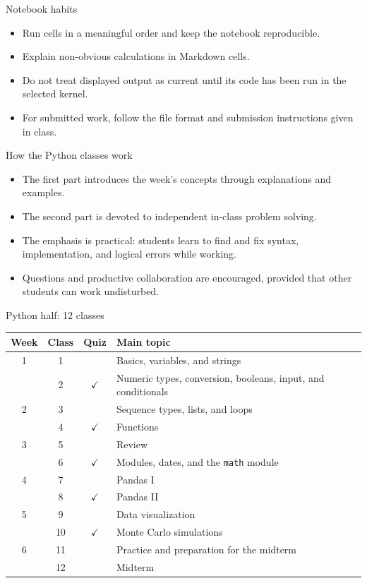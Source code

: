 \documentclass[aspectratio=169,11pt]{beamer}
\begin{document}
\begin{frame}{Notebook habits}
  \begin{itemize}
    \item Run cells in a meaningful order and keep the notebook reproducible.
    \item Explain non-obvious calculations in Markdown cells.
    \item Do not treat displayed output as current until its code has been run
          in the selected kernel.
    \item For submitted work, follow the file format and submission instructions
          given in class.
  \end{itemize}
\end{frame}


\begin{frame}{How the Python classes work}
  \begin{itemize}
    \item The first part introduces the week's concepts through explanations
          and examples.
    \item The second part is devoted to independent in-class problem solving.
    \item The emphasis is practical: students learn to find and fix syntax,
          implementation, and logical errors while working.
    \item Questions and productive collaboration are encouraged, provided that
          other students can work undisturbed.
  \end{itemize}
\end{frame}

\begin{frame}{Python half: 12 classes}
  \small
  \begin{tabular}{cccp{}}
    \toprule
    Week & Class & Quiz & Main topic \\
    \midrule
    1 & 1  &           & Basics, variables, and strings \\
      & 2  & $\checkmark$ & Numeric types, conversion, booleans, input, and conditionals \\
    2 & 3  &           & Sequence types, lists, and loops \\
      & 4  & $\checkmark$ & Functions \\
    3 & 5  &           & Review \\
      & 6  & $\checkmark$ & Modules, dates, and the \texttt{math} module \\
    4 & 7  &           & Pandas I \\
      & 8  & $\checkmark$ & Pandas II \\
    5 & 9  &           & Data visualization \\
      & 10 & $\checkmark$ & Monte Carlo simulations \\
    6 & 11 &          & Practice and preparation for the midterm \\
      & 12 &          & Midterm \\
    \bottomrule
  \end{tabular}
\end{frame}
\end{document}
